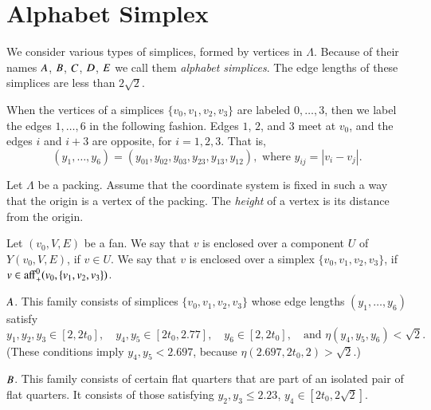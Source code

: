 \section{Alphabet Simplex}%
\label{sec:alphabet}

We consider various types of simplices, formed by vertices in $\Lambda$.  
Because of their names $A$, $B$, $C$, $D$, $E$ we call them
{\it alphabet simplices}.
  The edge lengths of
these simplices are less than $2\sqrt{2}$.


\begin{definition}\label{def:edge-convention}
When the vertices of a
simplices $\{v_0,v_1,v_2,v_3\}$ are labeled $0,\ldots,3$, then
we label the edges $1,\ldots,6$ in the following fashion.
Edges $1$, $2$, and $3$ meet at $v_0$, 
and the edges $i$ and $i+3$ are opposite, for $i=1,2,3$.
That is,
  $$
  (y_1,\ldots,y_6) = (y_{01},y_{02},y_{03},y_{23},y_{13},y_{12}),
  \text{ where } y_{ij} = |v_i - v_j|.
$$
%
\end{definition}



\begin{definition}[height] \label{def:height}  Let $\Lambda$ be a
packing.  Assume that the coordinate system is fixed in
such a way that the origin is a vertex of the packing.  The {\it
height\/} of a vertex is its distance from the origin.
%
\end{definition}

\begin{definition}[enclosed] \label{def:enclosed}
Let  $(v_0,V,E)$ be a fan.  We say that $v$ is enclosed over a component
$U$ of $Y(v_0,V,E)$, if $v\in U$.  We say that $v$ is enclosed over
a simplex $\{v_0,v_1,v_2,v_3\}$, if $v\in {\operatorname{aff}}_+^0(v_0,\{v_1,v_2,v_3\})$.
%
\end{definition}



$A$.  This family consists of simplices $\{v_0,v_1,v_2,v_3\}$ whose
edge lengths $(y_1,\ldots,y_6)$ satisfy
    $$
    y_1,y_2,y_3\in[2,2t_0],\quad
    y_4,y_5\in[2t_0,2.77],
    \quad
    y_6\in[2,2t_0],\quad \text{and }
    \eta(y_4,y_5,y_6)<\sqrt{2}.
    $$
(These conditions imply $y_4,y_5<2.697$, because
$\eta(2.697,2t_0,2)>\sqrt2$.)

$B$.  This family consists of certain flat quarters that are
part of an isolated pair of flat quarters. It consists of those
satisfying $y_2,y_3\le 2.23$, $y_4\in[2t_0,2\sqrt{2}]$.

